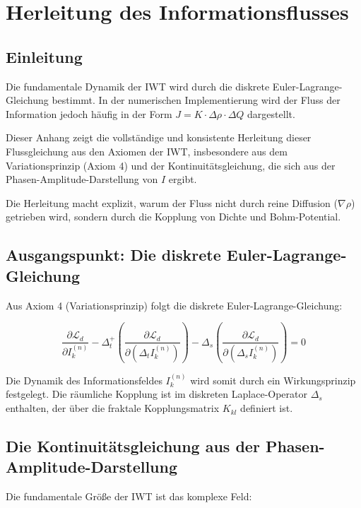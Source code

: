 \chapter{Herleitung des Informationsflusses}
\label{anhang:fluss}

\section{Einleitung}

Die fundamentale Dynamik der IWT wird durch die diskrete Euler-Lagrange-Gleichung bestimmt. 
In der numerischen Implementierung wird der Fluss der Information jedoch häufig in der Form
\( J = K \cdot \Delta \rho \cdot \Delta Q \) dargestellt. 

Dieser Anhang zeigt die vollständige und konsistente Herleitung dieser Flussgleichung 
aus den Axiomen der IWT, insbesondere aus dem Variationsprinzip (Axiom 4) und der 
Kontinuitätsgleichung, die sich aus der Phasen-Amplitude-Darstellung von \( I \) ergibt.

Die Herleitung macht explizit, warum der Fluss nicht durch reine Diffusion (\( \nabla \rho \)) 
getrieben wird, sondern durch die Kopplung von Dichte und Bohm-Potential.

\section{Ausgangspunkt: Die diskrete Euler-Lagrange-Gleichung}

Aus Axiom 4 (Variationsprinzip) folgt die diskrete Euler-Lagrange-Gleichung:

\[
\frac{\partial \mathcal{L}_d}{\partial I_k^{(n)}} 
- \Delta_t^+ \left( \frac{\partial \mathcal{L}_d}{\partial (\Delta_t I_k^{(n)})} \right) 
- \Delta_s \left( \frac{\partial \mathcal{L}_d}{\partial (\Delta_s I_k^{(n)})} \right) = 0
\]
\label{eq:euler_lagrange}

Die Dynamik des Informationsfeldes \( I_k^{(n)} \) wird somit durch ein Wirkungsprinzip 
festgelegt. Die räumliche Kopplung ist im diskreten Laplace-Operator 
\( \Delta_s \) enthalten, der über die fraktale Kopplungsmatrix \( K_{kl} \) definiert ist.

\section{Die Kontinuitätsgleichung aus der Phasen-Amplitude-Darstellung}

Die fundamentale Größe der IWT ist das komplexe Feld:

